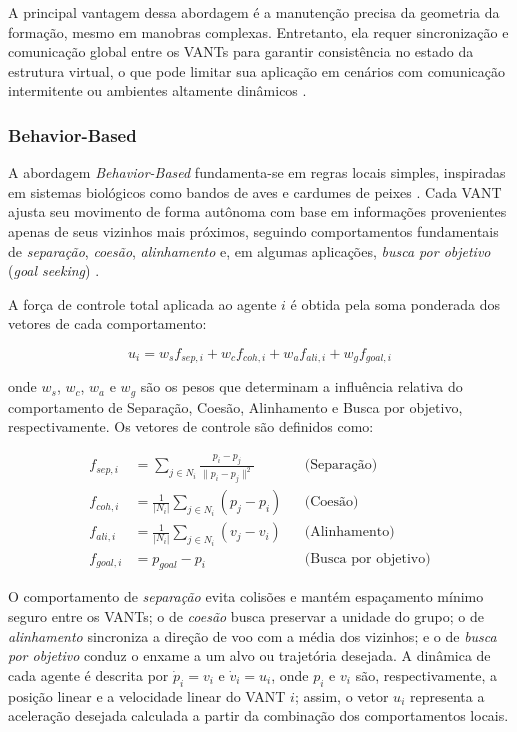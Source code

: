 A principal vantagem dessa abordagem é a manutenção precisa da geometria da formação, mesmo em manobras complexas. Entretanto, ela requer sincronização e comunicação global entre os VANTs para garantir consistência no estado da estrutura virtual, o que pode limitar sua aplicação em cenários com comunicação intermitente ou ambientes altamente dinâmicos \citep{bu2024advancement, ouyang2023formation}.


\subsubsection{Behavior-Based}

A abordagem \textit{Behavior-Based} fundamenta-se em regras locais simples, inspiradas em sistemas biológicos como bandos de aves e cardumes de peixes \citep{balch2002behaviorbased}. Cada VANT ajusta seu movimento de forma autônoma com base em informações provenientes apenas de seus vizinhos mais próximos, seguindo comportamentos fundamentais de \textit{separação}, \textit{coesão}, \textit{alinhamento} e, em algumas aplicações, \textit{busca por objetivo} (\textit{goal seeking}) \citep{ouyang2023formation, reynolds1987flocks}.

A força de controle total aplicada ao agente $i$ é obtida pela soma ponderada dos vetores de cada comportamento:

\begin{equation}
u_i = w_s f_{sep,i} + w_c f_{coh,i} + w_a f_{ali,i} + w_g f_{goal,i}
\end{equation}

onde $w_s$, $w_c$, $w_a$ e $w_g$ são os pesos que determinam a influência relativa do comportamento de Separação, Coesão, Alinhamento e Busca por objetivo, respectivamente. Os vetores de controle são definidos como:

\begin{equation}
\begin{aligned}
f_{sep,i} &= \sum_{j \in N_i} \frac{p_i - p_j}{\|p_i - p_j\|^2} && \text{(Separação)} \\[6pt]
f_{coh,i} &= \frac{1}{|N_i|}\sum_{j \in N_i}(p_j - p_i) && \text{(Coesão)} \\[6pt]
f_{ali,i} &= \frac{1}{|N_i|}\sum_{j \in N_i}(v_j - v_i) && \text{(Alinhamento)} \\[6pt]
f_{goal,i} &= p_{goal} - p_i && \text{(Busca por objetivo)}
\end{aligned}
\end{equation}

O comportamento de \textit{separação} evita colisões e mantém espaçamento mínimo seguro entre os VANTs; o de \textit{coesão} busca preservar a unidade do grupo; o de \textit{alinhamento} sincroniza a direção de voo com a média dos vizinhos; e o de \textit{busca por objetivo} conduz o enxame a um alvo ou trajetória desejada. A dinâmica de cada agente é descrita por $\dot{p}_i = v_i$ e $\dot{v}_i = u_i$, onde $p_i$ e $v_i$ são, respectivamente, a posição linear e a velocidade linear do VANT $i$; assim, o vetor $u_i$ representa a aceleração desejada calculada a partir da combinação dos comportamentos locais.

